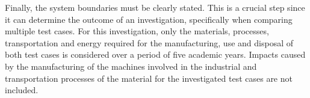 Finally, the system boundaries must be clearly stated. This is a crucial step since it can determine the outcome of an investigation, specifically when comparing multiple test cases. For this investigation, only the materials, processes, transportation and energy required for the manufacturing, use and disposal of both test cases is considered over a period of five academic years. Impacts caused by the manufacturing of the machines involved in the industrial and transportation processes of the material for the investigated test cases are not included.